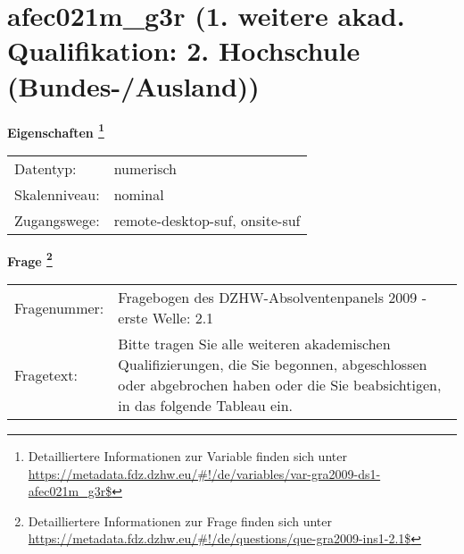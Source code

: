 
    \setcounter{footnote}{0}

    \vspace*{-1.8cm}
	\section{afec021m\_g3r (1. weitere akad. Qualifikation: 2. Hochschule (Bundes-/Ausland))}
	\label{section:afec021m_g3r}



    \vspace*{0.5cm}
    \noindent\textbf{Eigenschaften
	\footnote{Detailliertere Informationen zur Variable finden sich unter
		\url{https://metadata.fdz.dzhw.eu/\#!/de/variables/var-gra2009-ds1-afec021m_g3r$}}}\\
	\begin{tabularx}{\hsize}{@{}lX}
	Datentyp: & numerisch \\
	Skalenniveau: & nominal \\
	Zugangswege: &
	  remote-desktop-suf, 
	  onsite-suf
 \\
    \end{tabularx}



				\vspace*{0.5cm}
                \noindent\textbf{Frage
	                \footnote{Detailliertere Informationen zur Frage finden sich unter
		              \url{https://metadata.fdz.dzhw.eu/\#!/de/questions/que-gra2009-ins1-2.1$}}}\\
				\begin{tabularx}{\hsize}{@{}lX}
					Fragenummer: &
					  Fragebogen des DZHW-Absolventenpanels 2009 - erste Welle:
					  2.1
 \\
					Fragetext: & Bitte tragen Sie alle weiteren akademischen Qualifizierungen, die Sie begonnen, abgeschlossen oder abgebrochen haben oder die Sie beabsichtigen, in das folgende Tableau ein. \\
				\end{tabularx}





